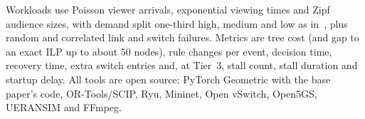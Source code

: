 \noindent Workloads use Poisson viewer arrivals, exponential viewing times and Zipf audience sizes, with demand split one-third high, medium and low as in~\cite{wang2026gnn}, plus random and correlated link and switch failures. Metrics are tree cost (and gap to an exact ILP up to about 50 nodes), rule changes per event, decision time, recovery time, extra switch entries and, at Tier~3, stall count, stall duration and startup delay. All tools are open source: PyTorch Geometric with the base paper's code, OR-Tools/SCIP, Ryu, Mininet, Open vSwitch, Open5GS, UERANSIM and FFmpeg.
